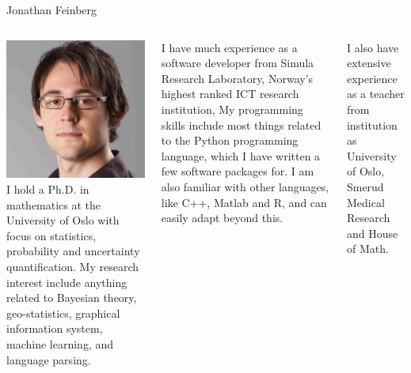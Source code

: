 \documentclass[norsk]{beamer}
\begin{document}
\begin{frame}{Jonathan Feinberg}
  \begin{columns}
  \includegraphics[width=\textwidth]{../people/jonathan.jpg}
     \tiny
I hold a Ph.D. in mathematics at the University of Oslo with focus on statistics, probability and uncertainty quantification. My research interest include anything related to Bayesian theory, geo-statistics, graphical information system, machine learning, and language parsing.

I have much experience as a software developer from Simula Research Laboratory, Norway's highest ranked ICT research institution,  My programming skills include most things related to the Python programming language, which I have written a few software packages for. I am also familiar with other languages, like C++, Matlab and R, and can easily adapt beyond this.

I also have extensive experience as a teacher from institution as University of Oslo, Smerud Medical Research and House of Math.
  \end{columns}
\end{frame}
\end{document}
